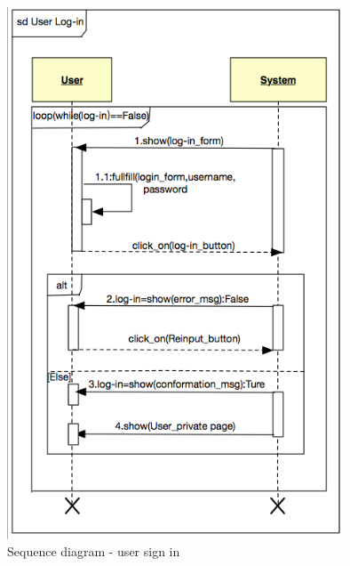 \documentclass[12pt, letterpaper]{article}
\begin{document}
\begin{figure}[H]
\centering
\includegraphics[width=10cm]{usersignin.png}
\caption{Sequence diagram - user sign in}
\end{figure}
\end{document}
